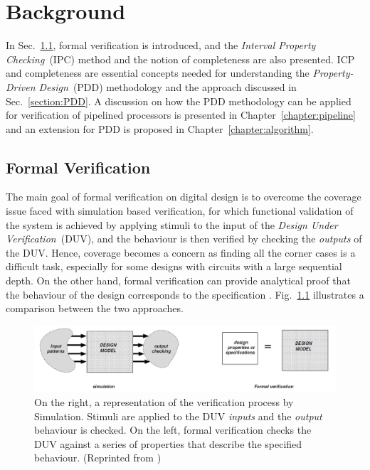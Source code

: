 \chapter{Background}
\label{chapter:backgroung}

In Sec.~\ref{section:formal-verification}, formal verification is introduced, and the \textit{Interval Property Checking}~(IPC) method and the notion of completeness are also presented. ICP and completeness are essential concepts needed for understanding the \textit{Property-Driven Design}~(PDD) methodology and the \SSQED{} approach discussed in Sec.~\ref{section:PDD}. A discussion on how the PDD methodology can be applied for verification of pipelined processors is presented in Chapter~\ref{chapter:pipeline} and an extension for PDD is proposed in Chapter~\ref{chapter:algorithm}.

\section{Formal Verification}
\label{section:formal-verification}

The main goal of formal verification on digital design is to overcome the coverage issue faced with simulation based verification, for which functional validation of the system is achieved by applying stimuli to the input of the \textit{Design Under Verification}~(DUV), and the behaviour is then verified by checking the \textit{outputs} of the DUV. Hence, coverage becomes a concern as finding all the corner cases is a difficult task, especially for some designs with circuits with a large sequential depth. On the other hand, formal verification can provide analytical proof that the behaviour of the design corresponds to the specification \cite{thesis-formal}. Fig.~\ref{fig:sim-vs-formal} illustrates a comparison between the two approaches.

\begin{figure}[htb!]
	\centering
	\includegraphics[width=\textwidth]{images/sim_vs_formal.PNG}
	\caption{On the right, a representation of the verification process by Simulation. Stimuli are applied to the DUV \textit{inputs} and the \textit{output} behaviour is checked. On the left, formal verification checks the DUV against a series of properties that describe the specified behaviour. (Reprinted from \cite{thesis-formal})}
	\label{fig:sim-vs-formal}
\end{figure}

